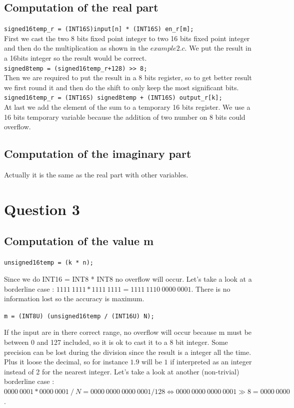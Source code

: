 \documentclass[a4paper]{article}
\begin{document}
\subsection{Computation of the real part}

\verb|signed16temp_r = (INT16S)input[n] * (INT16S) en_r[m];|
\\
First we cast the two 8 bits fixed point integer to two 16 bits fixed point integer and then do the multiplication as shown in the $example2.c$. We put the result in a 16bits integer so the result would be correct.
\\
\verb|signed8temp = (signed16temp_r+128) >> 8;|
\\
Then we are required to put the result in a 8 bits register, so to get better result we first round it and then do the shift to only keep the most significant bits.
\\
\verb|signed16temp_r = (INT16S) signed8temp + (INT16S) output_r[k];|
\\
At last we add the element of the sum to a temporary 16 bits register. We use a 16 bits temporary variable because the addition of two number on 8 bits could overflow.

\subsection{Computation of the imaginary part}

Actually it is the same as the real part with other variables.

\section{Question 3}

\subsection{Computation of the value m}

\verb|unsigned16temp = (k * n);|

Since we do INT16 = INT8 * INT8 no overflow will occur. Let's take a look at a borderline case :   $ 1111\ 1111 * 1111\ 1111 = 1111\ 1110\ 0000\ 0001 $. There is no information lost so the accuracy is maximum.

\verb|m = (INT8U) (unsigned16temp / (INT16U) N);|

If the input are in there correct range, no overflow will occur because m must be between 0 and 127 included, so it is ok to cast it to a 8 bit integer. Some precision can be lost during the division since the result is a integer all the time. Plus it loose the decimal, so for instance $1.9$ will be $1$ if interpreted as an integer instead of 2 for the nearest integer. Let's take a look at another (non-trivial) borderline case :   $ 0000\ 0001 * 0000\ 0001\ /\ N = 0000\ 0000\ 0000\ 0001 / 128 \Leftrightarrow 0000\ 0000\ 0000\ 0001 \gg 8 = 0000\ 0000 $.
\end{document}
